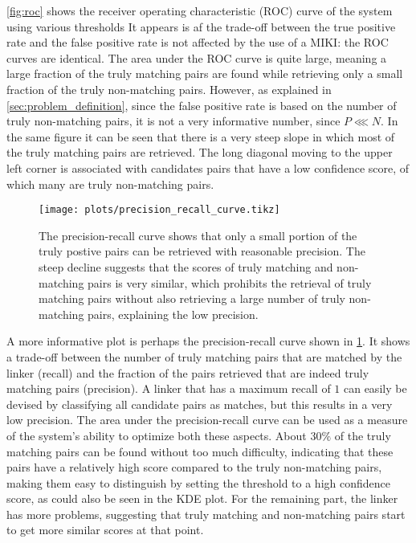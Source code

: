 \cref{fig:roc} shows the receiver operating characteristic (ROC) curve of the system using various thresholds
It appears is af the trade-off between the true positive rate and the false positive rate is not affected by the use of a MIKI: the ROC curves are identical.
The area under the ROC curve is quite large, meaning a large fraction of the truly matching pairs are found while retrieving only a small fraction of the truly non-matching pairs.
However, as explained in \cref{sec:problem_definition}, since the false positive rate is based on the number of truly non-matching pairs, it is not a very informative number, since $P \lll N$.
In the same figure it can be seen that there is a very steep slope in which most of the truly matching pairs are retrieved.
The long diagonal moving to the upper left corner is associated with candidates pairs that have a low confidence score, of which many are truly non-matching pairs.

\begin{figure}
    \centering
    \texttt{[image: plots/precision\_recall\_curve.tikz]}
   \caption{The precision-recall curve shows that only a small portion of the truly postive pairs can be retrieved with reasonable precision. The steep decline suggests that the scores of truly matching and non-matching pairs is very similar, which prohibits the retrieval of truly matching pairs without also retrieving a large number of truly non-matching pairs, explaining the low precision.}
    \label{fig:precision_recall}
\end{figure}

A more informative plot is perhaps the precision-recall curve shown in \cref{fig:precision_recall}.
It shows a trade-off between the number of truly matching pairs that are matched by the linker (recall) and the fraction of the pairs retrieved that are indeed truly matching pairs (precision).
A linker that has a maximum recall of $1$ can easily be devised by classifying all candidate pairs as matches, but this results in a very low precision.
The area under the precision-recall curve can be used as a measure of the system's ability to optimize both these aspects.
About $30\%$ of the truly matching pairs can be found without too much difficulty, indicating that these pairs have a relatively high score compared to the truly non-matching pairs, making them easy to distinguish by setting the threshold to a high confidence score, as could also be seen in the KDE plot.
For the remaining part, the linker has more problems, suggesting that truly matching and non-matching pairs start to get more similar scores at that point.

